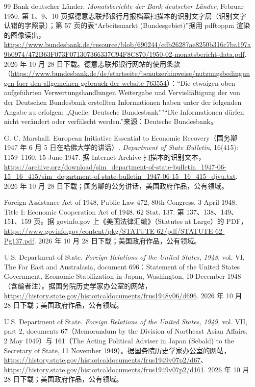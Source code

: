 \begin{thebibliography}{99}
 Bank deutscher Länder. \emph{Monatsberichte der Bank deutscher Länder}, Februar 1950. 第 1、9、10 页据德意志联邦银行月报档案扫描本的识别文字层（识别文字认错的字照录）；第 57 页的表“Arbeitsmarkt (Bundesgebiet)”据用 pdftoppm 渲染的图像读出，\url{https://www.bundesbank.de/resource/blob/690244/cdb26287ae8250b316c7ba197a9b0974/472B63F073F071307366337C94F8C870/1950-02-monatsbericht-data.pdf}. 2026 年 10 月 28 日下载。德意志联邦银行网站的使用条款（\url{https://www.bundesbank.de/de/startseite/benutzerhinweise/nutzungsbedingungen-fuer-den-allgemeinen-gebrauch-der-website-763554}）：“Die etwaigen oben aufgeführten Verwertungshandlungen Weitergabe und Vervielfältigung der von der Deutschen Bundesbank erstellten Informationen haben unter der folgenden Angabe zu erfolgen: „Quelle: Deutsche Bundesbank"”“Die Informationen dürfen nicht verändert oder verfälscht werden.”来源：Deutsche Bundesbank。

 G. C. Marshall. European Initiative Essential to Economic Recovery（国务卿 1947 年 6 月 5 日在哈佛大学的讲话）. \emph{Department of State Bulletin}, 16(415): 1159--1160, 15 June 1947. 据 Internet Archive 扫描本的识别文本，\url{https://archive.org/download/sim_department-of-state-bulletin_1947-06-15_16_415/sim_department-of-state-bulletin_1947-06-15_16_415_djvu.txt}. 2026 年 10 月 28 日下载；国务卿的公务讲话，美国政府作品，公有领域。

 Foreign Assistance Act of 1948, Public Law 472, 80th Congress, 3 April 1948, Title I: Economic Cooperation Act of 1948. 62 Stat. 137. 第 137、138、149、151、159 页。据 govinfo.gov 上《美国法律汇编》（Statutes at Large）的 PDF，\url{https://www.govinfo.gov/content/pkg/STATUTE-62/pdf/STATUTE-62-Pg137.pdf}. 2026 年 10 月 28 日下载；美国政府作品，公有领域。

 U.S. Department of State. \emph{Foreign Relations of the United States, 1948}, vol. VI, The Far East and Australasia, document 696：Statement of the United States Government, Economic Stabilization in Japan, Washington, 10 December 1948（含编者注）。据国务院历史学家办公室的网站，\url{https://history.state.gov/historicaldocuments/frus1948v06/d696}. 2026 年 10 月 28 日下载；美国政府作品，公有领域。

 U.S. Department of State. \emph{Foreign Relations of the United States, 1949}, vol. VII, part 2, documents 67（Memorandum by the Division of Northeast Asian Affairs, 2 May 1949）与 161（The Acting Political Adviser in Japan (Sebald) to the Secretary of State, 11 November 1949）。据国务院历史学家办公室的网站，\url{https://history.state.gov/historicaldocuments/frus1949v07p2/d67}、\url{https://history.state.gov/historicaldocuments/frus1949v07p2/d161}. 2026 年 10 月 28 日下载；美国政府作品，公有领域。


\end{thebibliography}
